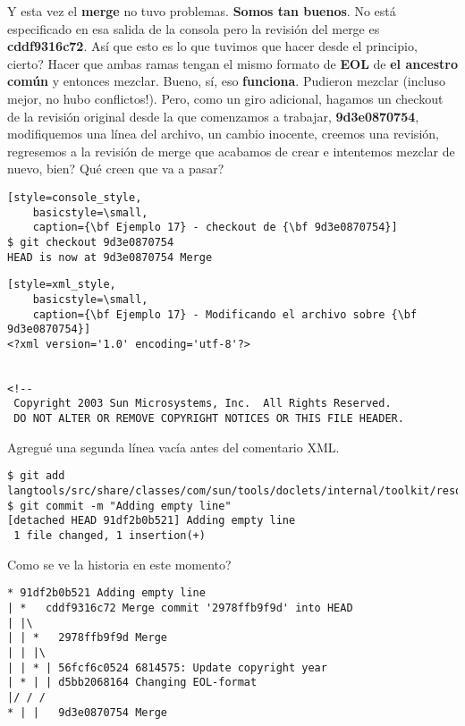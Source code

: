 Y esta vez el {\bf merge} no tuvo problemas. {\bf Somos tan buenos}. No está especificado en esa salida de la consola
pero la revisión del merge es {\bf cddf9316c72}. Así que esto es lo que tuvimos que hacer desde el principio, cierto?
Hacer que ambas ramas tengan el mismo formato de {\bf EOL} de {\bf el ancestro común} y entonces mezclar. Bueno, sí,
eso {\bf funciona}. Pudieron mezclar (incluso mejor, no hubo conflictos!). Pero, como un giro adicional, hagamos un checkout
de la revisión original desde la que comenzamos a trabajar, {\bf 9d3e0870754}, modifiquemos una línea del archivo, un cambio
inocente, creemos una revisión, regresemos a la revisión de merge que acabamos de crear e intentemos mezclar de nuevo, bien?
Qué creen que va a pasar?

\begin{lstlisting}[style=console_style,
	basicstyle=\small,
	caption={\bf Ejemplo 17} - checkout de {\bf 9d3e0870754}]
$ git checkout 9d3e0870754
HEAD is now at 9d3e0870754 Merge
\end{lstlisting}

\begin{lstlisting}[style=xml_style,
	basicstyle=\small,
	caption={\bf Ejemplo 17} - Modificando el archivo sobre {\bf 9d3e0870754}]
<?xml version='1.0' encoding='utf-8'?>


<!--
 Copyright 2003 Sun Microsystems, Inc.  All Rights Reserved.
 DO NOT ALTER OR REMOVE COPYRIGHT NOTICES OR THIS FILE HEADER.
\end{lstlisting}

Agregué una segunda línea vacía antes del comentario XML.

\begin{lstlisting}[style=console_style,
	basicstyle=\small,
	caption={\bf Ejemplo 17} - completando la revisión]
$ git add langtools/src/share/classes/com/sun/tools/doclets/internal/toolkit/resources/doclet.xml
$ git commit -m "Adding empty line"
[detached HEAD 91df2b0b521] Adding empty line
 1 file changed, 1 insertion(+)
\end{lstlisting}

Como se ve la historia en este momento?

\begin{lstlisting}[style=console_style,
	basicstyle=\small,
	caption={\bf Ejemplo 17} - historia actual]
* 91df2b0b521 Adding empty line
| *   cddf9316c72 Merge commit '2978ffb9f9d' into HEAD
| |\  
| | *   2978ffb9f9d Merge
| | |\  
| | * | 56fcf6c0524 6814575: Update copyright year
| * | | d5bb2068164 Changing EOL-format
|/ / /  
* | |   9d3e0870754 Merge
\end{lstlisting}

